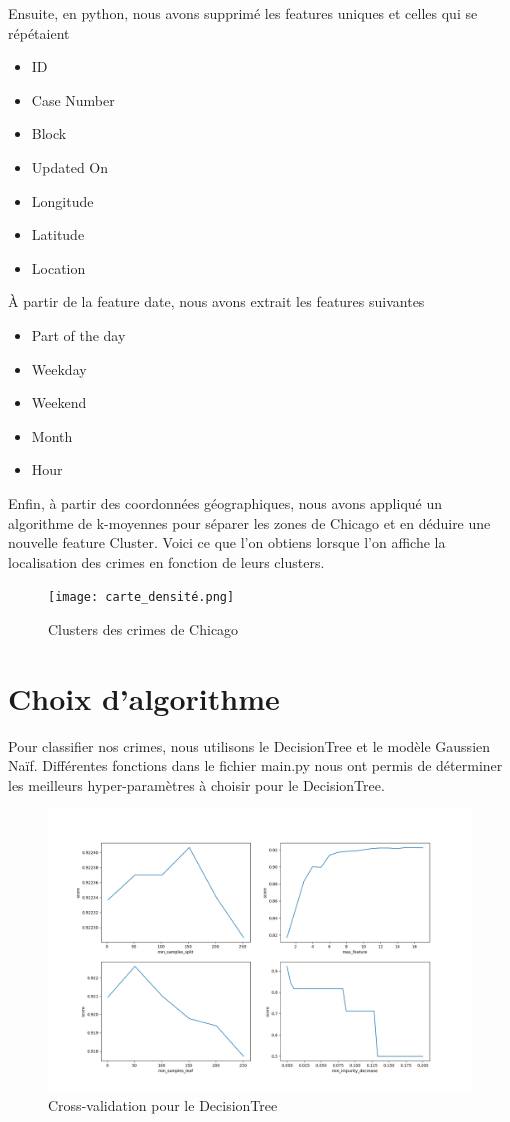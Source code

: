 \documentclass{article}
\begin{document}
    Ensuite, en python, nous avons supprimé les features uniques et celles qui se répétaient
    \begin{itemize}
	    \item ID
	    \item Case Number
	    \item Block
	    \item Updated On
	    \item Longitude
	    \item Latitude
	    \item Location
    \end{itemize}
    À partir de la feature date, nous avons extrait les features suivantes
    \begin{itemize}
	    \item Part of the day
	    \item Weekday
	    \item Weekend
	    \item Month
	    \item Hour
    \end{itemize}
    Enfin, à partir des coordonnées géographiques, nous avons appliqué un algorithme de k-moyennes pour séparer les zones de Chicago et en déduire une nouvelle feature Cluster. 
    Voici ce que l'on obtiens lorsque l'on affiche la localisation des crimes en fonction de leurs clusters.
    \begin{figure}[H]
            \centering
	    \texttt{[image: carte\_densité.png]}
	    \caption{Clusters des crimes de Chicago}
    \end{figure}

    \section{Choix d'algorithme}
    Pour classifier nos crimes, nous utilisons le DecisionTree et le modèle Gaussien Naïf.
    Différentes fonctions dans le fichier main.py nous ont permis de déterminer les meilleurs
    hyper-paramètres à choisir pour le DecisionTree.
    \begin{figure}[H]
            \centering
	    \includegraphics[scale=.4]{bestParamDecisionTree.png}
	    \caption{Cross-validation pour le DecisionTree}
    \end{figure}
\end{document}
